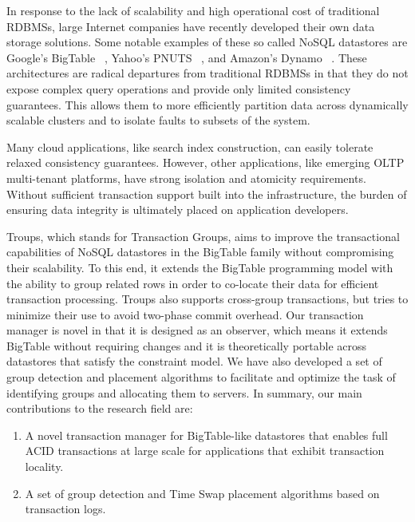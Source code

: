 \documentclass[10pt,final,journal]{IEEEtran}
\begin{document}
In response to the lack of scalability and high operational cost of traditional RDBMSs, large Internet companies have recently developed their own data storage solutions. Some notable examples of these so called NoSQL datastores are Google's BigTable ~\cite{Chang:2006:BDS:1267308.1267323}, Yahoo's PNUTS ~\cite{Cooper:2008:PYH:1454159.1454167}, and Amazon's Dynamo ~\cite{DeCandia:2007:DAH:1323293.1294281}. These architectures are radical departures from traditional RDBMSs in that they do not expose complex query operations and provide only limited consistency guarantees. This allows them to more efficiently partition data across dynamically scalable clusters and to isolate faults to subsets of the system.

Many cloud applications, like search index construction, can easily tolerate relaxed consistency guarantees. However, other applications, like emerging OLTP multi-tenant platforms, have strong isolation and atomicity requirements. Without sufficient transaction support built into the infrastructure, the burden of ensuring data integrity is ultimately placed on application developers.

Troups, which stands for Transaction Groups, aims to improve the transactional capabilities of NoSQL datastores in the BigTable family without compromising their scalability. To this end, it extends the BigTable programming model with the ability to group related rows in order to co-locate their data for efficient transaction processing. Troups also supports cross-group transactions, but tries to minimize their use to avoid two-phase commit overhead. Our transaction manager is novel in that it is designed as an observer, which means it extends BigTable without requiring changes and it is theoretically portable across datastores that satisfy the constraint model. We have also developed a set of group detection and placement algorithms to facilitate and optimize the task of identifying groups and allocating them to servers. In summary, our main contributions to the research field are:

\begin{enumerate}
\item A novel transaction manager for BigTable-like datastores that enables full ACID transactions at large scale for applications that exhibit transaction locality.
\item A set of group detection and Time Swap placement algorithms based on transaction logs.
\end{enumerate}
\end{document}
